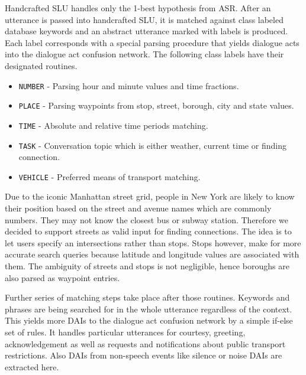Handcrafted \ac{SLU} handles only the 1-best hypothesis from \ac{ASR}.
After an utterance is passed into handcrafted \ac{SLU}, it is matched against class labeled database keywords and an abstract utterance marked with labels is produced.
Each label corresponds with a special parsing procedure that yields dialogue acts into the dialogue act confusion network.
The following class labels have their designated routines.

\begin{itemize}
	\item \texttt{NUMBER} - Parsing hour and minute values and time fractions.
	\item \texttt{PLACE} - Parsing waypoints from stop, street, borough, city and state values.
	\item \texttt{TIME} - Absolute and relative time periods matching.
	\item \texttt{TASK} - Conversation topic which is either weather, current time or finding connection.
	\item \texttt{VEHICLE} - Preferred means of transport matching.
\end{itemize}

Due to the iconic Manhattan street grid, people in New York are likely to know their position based on the street and avenue names which are commonly numbers.
They may not know the closest bus or subway station.
Therefore we decided to support streets as valid input for finding connections.
The idea is to let users specify an intersections rather than stops.
Stops however, make for more accurate search queries because latitude and longitude values are associated with them.
The ambiguity of streets and stops is not negligible, hence boroughs are also parsed as waypoint entries.

Further series of matching steps take place after those routines.
Keywords and phrases are being searched for in the whole utterance regardless of the context.
This yields more \acp{DAI} to the dialogue act confusion network by a simple if-else set of rules.
It handles particular utterances for courtesy, greeting, acknowledgement as well as requests and notifications about public transport restrictions.
Also \acp{DAI} from non-speech events like silence or noise \acp{DAI} are extracted here.

